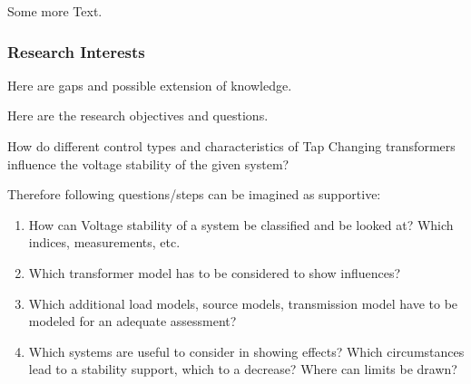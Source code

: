 \lipsum[2]
Some more Text.

\lipsum[3]

\clearpage

\subsubsection{Research Interests}

Here are gaps and possible extension of knowledge.

Here are the research objectives and questions.


\begin{tcolorbox}[float, colback=ees_blue!5!white,colframe=ees_blue, toptitle=1mm, bottomtitle=1mm, left=2mm, right=2.5mm, top=2mm, bottom=2mm, title={\textbf{Research Question of this Thesis}}]
    How do different control types and characteristics of Tap Changing transformers influence the voltage stability of the given system?
\end{tcolorbox}

Therefore following questions/steps can be imagined as supportive:
\begin{enumerate}
    \item How can Voltage stability of a system be classified and be looked at? Which indices, measurements, etc.
    \item Which transformer model has to be considered to show influences?
    \item Which additional load models, source models, transmission model have to be modeled for an adequate assessment?
    \item Which systems are useful to consider in showing effects? Which circumstances lead to a stability support, which to a decrease? Where can limits be drawn?
\end{enumerate}

